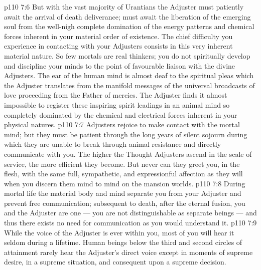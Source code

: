 \vs p110 7:6 \pc But with the vast majority of Urantians the Adjuster must patiently await the arrival of death deliverance; must await the liberation of the emerging soul from the well\hyp{}nigh complete domination of the energy patterns and chemical forces inherent in your material order of existence. The chief difficulty you experience in contacting with your Adjusters consists in this very inherent material nature. So few mortals are real thinkers; you do not spiritually develop and discipline your minds to the point of favourable liaison with the divine Adjusters. The ear of the human mind is almost deaf to the spiritual pleas which the Adjuster translates from the manifold messages of the universal broadcasts of love proceeding from the Father of mercies. The Adjuster finds it almost impossible to register these inspiring spirit leadings in an animal mind so completely dominated by the chemical and electrical forces inherent in your physical natures.
\vs p110 7:7 Adjusters rejoice to make contact with the mortal mind; but they must be patient through the long years of silent sojourn during which they are unable to break through animal resistance and directly communicate with you. The higher the Thought Adjusters ascend in the scale of service, the more efficient they become. But never can they greet you, in the flesh, with the same full, sympathetic, and expressionful affection as they will when you discern them mind to mind on the mansion worlds.
\vs p110 7:8 During mortal life the material body and mind separate you from your Adjuster and prevent free communication; subsequent to death, after the eternal fusion, you and the Adjuster are one --- you are not distinguishable as separate beings --- and thus there exists no need for communication as you would understand it.
\vs p110 7:9 While the voice of the Adjuster is ever within you, most of you will hear it seldom during a lifetime. Human beings below the third and second circles of attainment rarely hear the Adjuster’s direct voice except in moments of supreme desire, in a supreme situation, and consequent upon a supreme decision.
